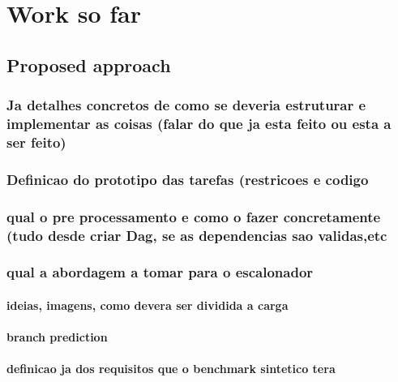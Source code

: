 \chapter{Work so far}
\section{Proposed approach}
\subsection{Ja detalhes concretos de como se deveria estruturar e implementar as coisas (falar do que ja esta feito ou esta a ser feito)}
\subsection{Definicao do prototipo das tarefas (restricoes e codigo}
\subsection{qual o pre processamento e como o fazer concretamente (tudo desde criar Dag, se as dependencias sao validas,etc}
\subsection{qual a abordagem a tomar para o escalonador}
\subsubsection{ideias, imagens, como devera ser dividida a carga}
\subsubsection{branch prediction}
\subsubsection{definicao ja dos requisitos que o benchmark sintetico tera}